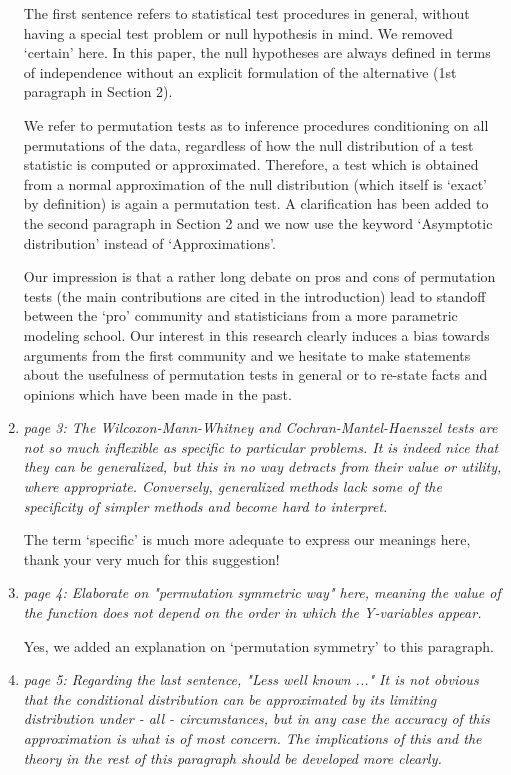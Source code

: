 \documentclass[11pt]{article}
\begin{document}
\begin{enumerate}
The first sentence refers to statistical test procedures in general,
without having a special test problem or null hypothesis in mind. We removed
`certain' here. In this paper, the null hypotheses are always defined in
terms of independence without an explicit formulation of the alternative
(1st paragraph in Section 2).

We refer to permutation tests as to inference procedures conditioning on all
permutations of the data, regardless of how the null distribution of a test
statistic is computed or approximated. Therefore, a test which is obtained
from a normal approximation of the null distribution (which itself is
`exact' by definition) is again a permutation test. A clarification has been
added to the second paragraph in Section 2 and we now use the keyword 
`Asymptotic distribution' instead of `Approximations'.

Our impression is that a rather long debate on pros and cons of permutation
tests (the main contributions are cited in the introduction) lead to standoff
between the `pro' community and statisticians from a more parametric
modeling school. Our interest in this research clearly induces a bias
towards arguments from the first community and we hesitate to make
statements about the usefulness of permutation tests in general or to
re-state facts and opinions which have been made in the past.

\item \textsl{page 3:  The Wilcoxon-Mann-Whitney and Cochran-Mantel-Haenszel tests are not 
              so much inflexible as specific to particular problems. It is indeed nice that they 
              can be generalized, but this in no way detracts from their value or utility, where 
              appropriate. Conversely, generalized methods lack some of the specificity of 
              simpler methods and become hard to interpret.}

The term `specific' is much more adequate to express our meanings here,
thank your very much for this suggestion! 

\item \textsl{page 4:  Elaborate on "permutation symmetric way" here, meaning the value of the 
              function does not depend on the order in which the Y-variables appear.}

Yes, we added an explanation on `permutation
symmetry' to this paragraph.
 
\item \label{asympt} \textsl{page 5:  Regarding the last sentence, "Less well known ..." It is not obvious that 
              the conditional distribution can be approximated by its limiting distribution 
              under - all - circumstances, but in any case the accuracy of this approximation 
              is what is of most concern. The implications of this and the theory in the rest of 
              this paragraph should be developed more clearly. }


\end{enumerate}
\end{document}
